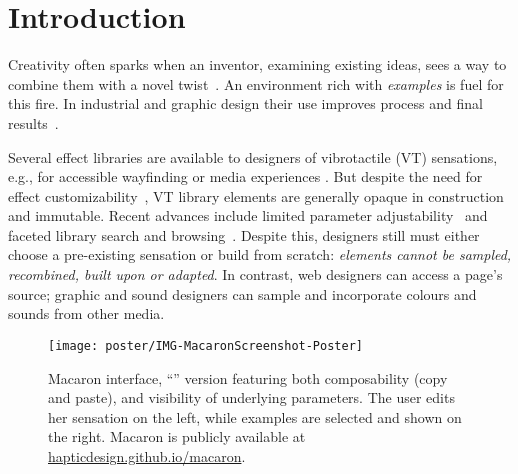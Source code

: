\section{Introduction}

Creativity often sparks when an inventor, examining existing ideas, sees a way to combine them with a novel twist~\cite{Warr2005}.
An environment rich with \emph{examples} is fuel for this fire. In industrial and graphic design \cite{Buxton2007,Herring2009} their use improves process and final results~\cite{Dow2011,Lee2010a}.

Several effect libraries are available to designers of vibrotactile (VT) sensations, e.g., for accessible wayfinding \cite{Zelek2003} or %
media experiences \cite{SchneiderAsiaHaptics2014,Israr2014,ImmersionCorporation,Culbertson2014}. 
But despite the need for effect customizability~\cite{Seifi2014}, VT library elements are generally opaque in construction and immutable.
Recent advances include limited parameter adjustability~\cite{Israr2014,SchneiderAsiaHaptics2014} and faceted library search and browsing~\cite{Seifi2015}. 
Despite this, designers still must either choose a pre-existing sensation or build from scratch:
\textit{elements cannot be sampled, recombined, built upon or adapted}. %
In contrast, web designers can access a page's source;
graphic and sound designers can sample and incorporate colours and sounds from other media.



\begin{figure}
        \centering
        \texttt{[image: poster/IMG-MacaronScreenshot-Poster]}
        \caption{Macaron interface, ``\hi'' version featuring both composability (copy and paste), and visibility of underlying parameters. The user edits her sensation on the left, while examples are selected and shown on the right. 
        Macaron is publicly available at \url{hapticdesign.github.io/macaron}.
}
        \label{fig:macaron:hi}
\end{figure}




